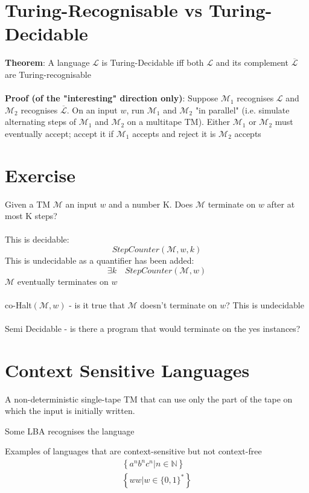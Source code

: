 \documentclass{article}[18pt]
\begin{document}
\section{Turing-Recognisable vs Turing-Decidable}
\textbf{Theorem}: A language $\mathscr{L}$ is Turing-Decidable iff both $\mathscr{L}$ and its complement $\overline{\mathscr{L}}$ are Turing-recognisable\\
\\
\textbf{Proof (of the "interesting" direction only)}: Suppose $\mathscr{M}_1$ recognises $\mathscr{L}$ and $\mathscr{M}_2$ recognises $\overline{\mathscr{L}}$. On an input $w$, run $\mathscr{M}_1$ and $\mathscr{M}_2$ "in parallel" (i.e. simulate alternating steps of $\mathscr{M}_1$ and $\mathscr{M}_2$ on a multitape TM). Either $\mathscr{M}_1$ or $\mathscr{M}_2$ must eventually accept; accept it if $\mathscr{M}_1$ accepts and reject it is $\mathscr{M}_2$ accepts
\section{Exercise}
Given a TM $\mathscr{M}$ an input $w$ and a number K. Does $\mathscr{M}$ terminate on $w$ after at most K steps?\\
\\
This is decidable:
$$StepCounter(\mathscr{M},w,k)$$
This is undecidable as a quantifier has been added:
$$\exists k \quad StepCounter(\mathscr{M},w)$$
$\mathscr{M}$ eventually terminates on $w$\\
\\
co-Halt$(\mathscr{M},w)$ - is it true that $\mathscr{M}$ doesn't terminate on $w$? This is undecidable\\
\\
Semi Decidable - is there a program that would terminate on the yes instances?

\section{Context Sensitive Languages}
\begin{defin}
A non-deterministic single-tape TM that can use only the part of the tape on which the input is initially written.
\end{defin}
\begin{defin}
Some LBA recognises the language
\end{defin}

Examples of languages that are context-sensitive but not context-free
\[
\begin{array}{l}{\left\{a^{n} b^{n} c^{n} | n \in \mathbb{N}\right\}} \\ {\left\{w w | w \in\{0,1\}^{*}\right\}}\end{array}
\]
\end{document}
